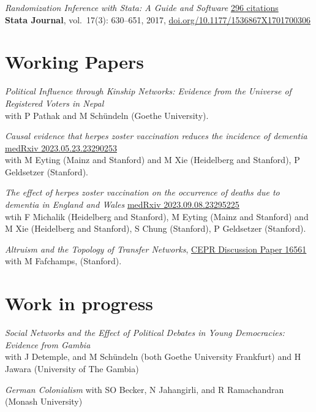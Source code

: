 \documentclass[
  a4paper,10pt]{article}
\begin{document}
\emph{Randomization Inference with Stata: A Guide and Software}
\href{https://scholar.google.de/citations?user=E_zs3XIAAAAJ}{296
citations} \\
\textbf{Stata Journal}, vol.~17(3): 630--651, 2017,
\href{https://doi.org/10.1177/1536867X1701700306}{doi.org/10.1177/1536867X1701700306}

\hypertarget{working-papers}{%
\section{Working Papers}\label{working-papers}}

\emph{Political Influence through Kinship Networks: Evidence from the
Universe of Registered Voters in Nepal}\\
with P Pathak and M Schündeln (Goethe University).

\emph{Causal evidence that herpes zoster vaccination reduces the
incidence of dementia}
\href{https://doi.org/10.1101/2023.05.23.23290253}{medRxiv
2023.05.23.23290253}\\
with M Eyting (Mainz and Stanford) and M Xie (Heidelberg and Stanford),
P Geldsetzer (Stanford).

\emph{The effect of herpes zoster vaccination on the occurrence of
deaths due to dementia in England and Wales}
\href{https://doi.org/10.1101/2023.09.08.23295225}{medRxiv
2023.09.08.23295225}\\
wtih F Michalik (Heidelberg and Stanford), M Eyting (Mainz and Stanford)
and M Xie (Heidelberg and Stanford), S Chung (Stanford), P Geldsetzer
(Stanford).

\emph{Altruism and the Topology of Transfer Networks},
\href{https://hesss.org/Gambia_Topology.pdf}{CEPR Discussion Paper
16561}\\
with M Fafchamps, (Stanford).

\hypertarget{work-in-progress}{%
\section{Work in progress}\label{work-in-progress}}

\emph{Social Networks and the Effect of Political Debates in Young
Democracies: Evidence from Gambia}\\
with J Detemple, and M Schündeln (both Goethe University Frankfurt) and
H Jawara (University of The Gambia)

\emph{German Colonialism} with SO Becker, N Jahangirli, and R
Ramachandran (Monash University)
\end{document}
